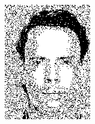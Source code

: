 \begin{figure}[h]
{\begin{subfigure}[b]{0.23\textwidth}
         \includegraphics[width=\textwidth]{images/results/cross/aa46_1.color.d3_ecu_sch_bayes.png}
     \end{subfigure}}
    

\end{figure}
